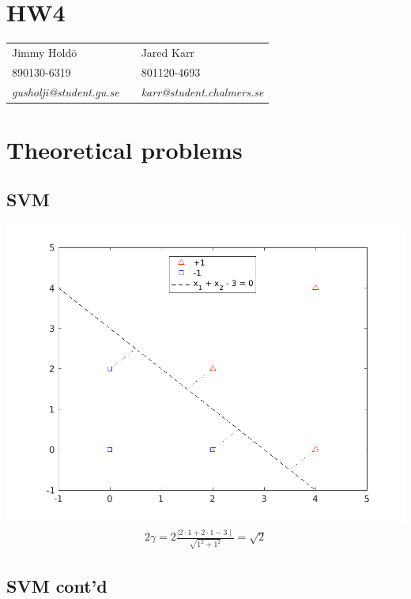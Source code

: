 \documentclass[a4paper,11pt]{article}
\begin{document}
\section*{HW4}

\begin{tabular*}{0.9\textwidth}{@{\extracolsep{\fill} } lll}
Jimmy Hold\"{o} & & Jared Karr\\
890130-6319 & & 801120-4693\\
\it{gusholji@student.gu.se} & & \it{karr@student.chalmers.se}\\
\end{tabular*}
\section{Theoretical problems}
\subsection{SVM}
\includegraphics[width=\textwidth]{P1_1}
\begin{align*}
  2\gamma = 2\frac{\mid2\cdot1+2\cdot1-3\mid}{\sqrt{1^2+1^2}} = \sqrt{2}
\end{align*}
\subsection{SVM cont'd}
\end{document}
